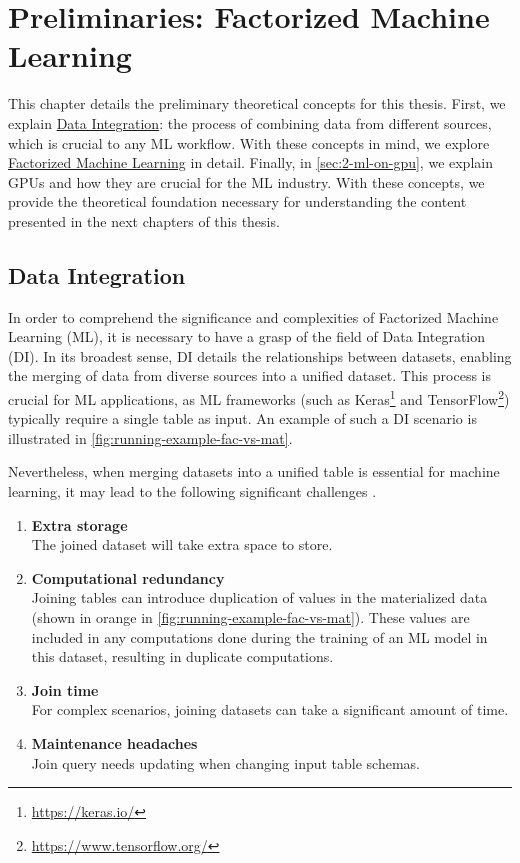 
\chapter{Preliminaries: Factorized Machine Learning}
\label{chapter:preliminary}

This chapter details the preliminary theoretical concepts for this thesis. First, we explain \hyperref[sec:2-data-integration]{Data Integration}: the process of combining data from different sources, which is crucial to any ML workflow. With these concepts in mind, we explore \hyperref[sec:2-factorized-ml]{Factorized Machine Learning} in detail. Finally, in \autoref{sec:2-ml-on-gpu}, we explain GPUs and how they are crucial for the ML industry. With these concepts, we provide the theoretical foundation necessary for understanding the content presented in the next chapters of this thesis.


\section{Data Integration}
\label{sec:2-data-integration}
In order to comprehend the significance and complexities of Factorized Machine Learning (ML), it is necessary to have a grasp of the field of Data Integration (DI). In its broadest sense, DI details the relationships between datasets, enabling the merging of data from diverse sources into a unified dataset. This process is crucial for ML applications, as ML frameworks (such as Keras\footnote{\url{https://keras.io/}} and TensorFlow\footnote{\url{https://www.tensorflow.org/}}) typically require a single table as input. An example of such a DI scenario is illustrated in \autoref{fig:running-example-fac-vs-mat}.

Nevertheless, when merging datasets into a unified table is essential for machine learning, it may lead to the following significant challenges \cite{data-management-in-ML-kumar-2017}.

\begin{enumerate}
    \item \textbf{Extra storage}\\ The joined dataset will take extra space to store.
    \item \textbf{Computational redundancy} \\ Joining tables can introduce duplication of values in the materialized data (shown in orange in \autoref{fig:running-example-fac-vs-mat}). These values are included in any computations done during the training of an ML model in this dataset, resulting in duplicate computations.
    \item \textbf{Join time} \\For complex scenarios, joining datasets can take a significant amount of time.
    \item \textbf{Maintenance headaches} \\Join query needs updating when changing input table schemas.
\end{enumerate}

